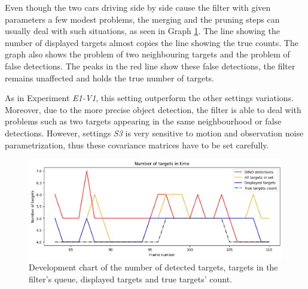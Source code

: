 Even though the two cars driving side by side cause the filter with given parameters a few modest problems, the merging
and
the pruning steps can usually deal with such situations, as seen in Graph \ref{gr:E1-V2-S3}. The line
showing
the number of displayed targets almost copies the line showing the true counts. The graph also shows the problem of
two neighbouring targets and the problem of false detections. The peaks in the red line show these false detections,
the filter remains unaffected and holds the true number of targets.


As in Experiment \textit{E1-V1}, this setting outperform the other settings variations. Moreover, due to the more
precise
object detection, the filter is able to deal with problems such as two targets appearing in the same neighbourhood or
false
detections. However, settings \textit{S3} is very sensitive to motion and observation noise parametrization, thus
these covariance matrices have to be set carefully.

\begin{figure}[H]
    \centering
    \includegraphics[width=\linewidth]{../../../experiments/E1/V2/DINO/dino_det}
    \caption{Development chart of the number of detected targets, targets in the filter's queue, displayed targets and
    true targets' count.}
    \label{gr:E1-V2-S3}
\end{figure}

